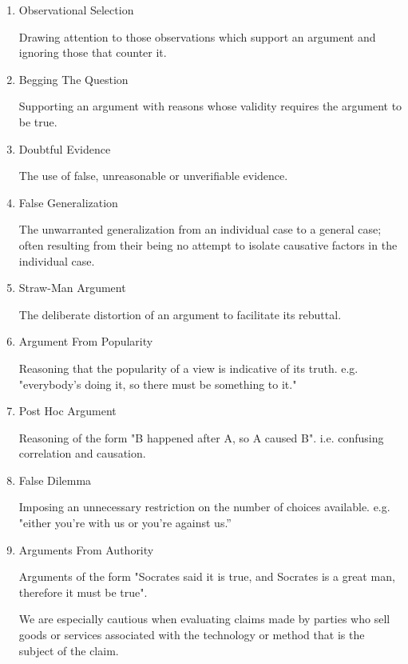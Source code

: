 \documentclass{article}
\begin{document}
\begin{enumerate}
\begin{enumerate}
\item Observational Selection
\label{sec:orgheadline349}

Drawing attention to those observations which support an argument and
ignoring those that counter it.

\item Begging The Question
\label{sec:orgheadline350}

Supporting an argument with reasons whose validity requires the argument
to be true.

\item Doubtful Evidence
\label{sec:orgheadline351}

The use of false, unreasonable or unverifiable evidence.

\item False Generalization
\label{sec:orgheadline352}

The unwarranted generalization from an individual case to a general
case; often resulting from their being no attempt to isolate causative
factors in the individual case.

\item Straw-Man Argument
\label{sec:orgheadline353}

The deliberate distortion of an argument to facilitate its rebuttal.

\item Argument From Popularity
\label{sec:orgheadline354}

Reasoning that the popularity of a view is indicative of its truth. e.g.
"everybody's doing it, so there must be something to it."

\item Post Hoc Argument
\label{sec:orgheadline355}

Reasoning of the form "B happened after A, so A caused B". i.e.
confusing correlation and causation.

\item False Dilemma
\label{sec:orgheadline356}

Imposing an unnecessary restriction on the number of choices available.
e.g. "either you're with us or you're against us.”

\item Arguments From Authority
\label{sec:orgheadline357}

Arguments of the form "Socrates said it is true, and Socrates is a great
man, therefore it must be true".

We are especially cautious when evaluating claims made by parties who
sell goods or services associated with the technology or method that is
the subject of the claim.
\end{enumerate}


\end{enumerate}
\end{document}
